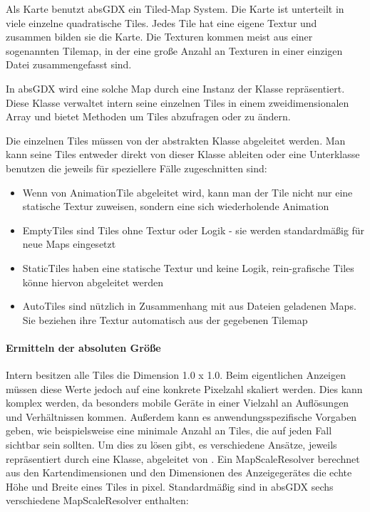 Als Karte benutzt absGDX ein Tiled-Map System. Die Karte ist unterteilt in viele einzelne quadratische Tiles.
Jedes Tile hat eine eigene Textur und zusammen bilden sie die Karte. Die Texturen kommen meist aus einer sogenannten Tilemap, in der eine große Anzahl an Texturen in einer einzigen Datei zusammengefasst sind.


In absGDX wird eine solche Map durch eine Instanz der Klasse  repräsentiert. Diese Klasse verwaltet intern seine einzelnen Tiles in einem zweidimensionalen Array und bietet Methoden um Tiles abzufragen oder zu ändern.

Die einzelnen Tiles müssen von der abstrakten Klasse  abgeleitet werden. Man kann seine Tiles entweder direkt von dieser Klasse ableiten oder eine Unterklasse benutzen die jeweils für speziellere Fälle zugeschnitten sind:

\begin{itemize}
  \item {} Wenn von AnimationTile abgeleitet wird, kann man der Tile nicht nur eine statische Textur zuweisen, sondern eine sich wiederholende Animation
  \item {} EmptyTiles sind Tiles ohne Textur oder Logik - sie werden standardmäßig für neue Maps eingesetzt
  \item {} StaticTiles haben eine statische Textur und	keine Logik, rein-grafische Tiles könne hiervon abgeleitet werden
  \item {} AutoTiles sind nützlich in Zusammenhang mit aus Dateien geladenen Maps. Sie beziehen ihre Textur automatisch aus der gegebenen Tilemap
\end{itemize}

\paragraph{Ermitteln der absoluten Größe}

Intern besitzen alle Tiles die Dimension 1.0 x 1.0. Beim eigentlichen Anzeigen müssen diese Werte jedoch auf eine konkrete Pixelzahl skaliert werden. Dies kann komplex werden, da besonders mobile Geräte in einer Vielzahl an Auflösungen und Verhältnissen kommen. Außerdem kann es anwendungsspezifische Vorgaben geben, wie beispielsweise eine minimale Anzahl an Tiles, die auf jeden Fall sichtbar sein sollten.
Um dies zu lösen gibt, es verschiedene Ansätze, jeweils repräsentiert durch eine Klasse, abgeleitet von .
Ein MapScaleResolver berechnet aus den Kartendimensionen und den Dimensionen des Anzeigegerätes die echte Höhe und Breite eines Tiles in pixel.
Standardmäßig sind in absGDX sechs verschiedene MapScaleResolver enthalten:

